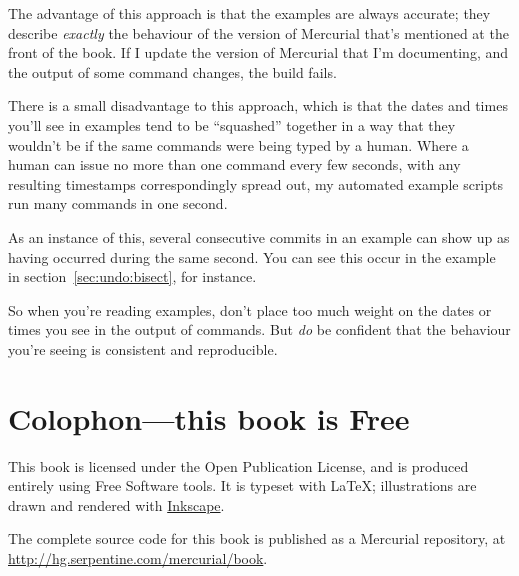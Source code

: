 The advantage of this approach is that the examples are always
accurate; they describe \emph{exactly} the behaviour of the version of
Mercurial that's mentioned at the front of the book.  If I update the
version of Mercurial that I'm documenting, and the output of some
command changes, the build fails.

There is a small disadvantage to this approach, which is that the
dates and times you'll see in examples tend to be ``squashed''
together in a way that they wouldn't be if the same commands were
being typed by a human.  Where a human can issue no more than one
command every few seconds, with any resulting timestamps
correspondingly spread out, my automated example scripts run many
commands in one second.

As an instance of this, several consecutive commits in an example can
show up as having occurred during the same second.  You can see this
occur in the  example in section~\ref{sec:undo:bisect},
for instance.

So when you're reading examples, don't place too much weight on the
dates or times you see in the output of commands.  But \emph{do} be
confident that the behaviour you're seeing is consistent and
reproducible.

\section{Colophon---this book is Free}

This book is licensed under the Open Publication License, and is
produced entirely using Free Software tools.  It is typeset with
\LaTeX{}; illustrations are drawn and rendered with
\href{http://www.inkscape.org/}{Inkscape}.

The complete source code for this book is published as a Mercurial
repository, at \url{http://hg.serpentine.com/mercurial/book}.

